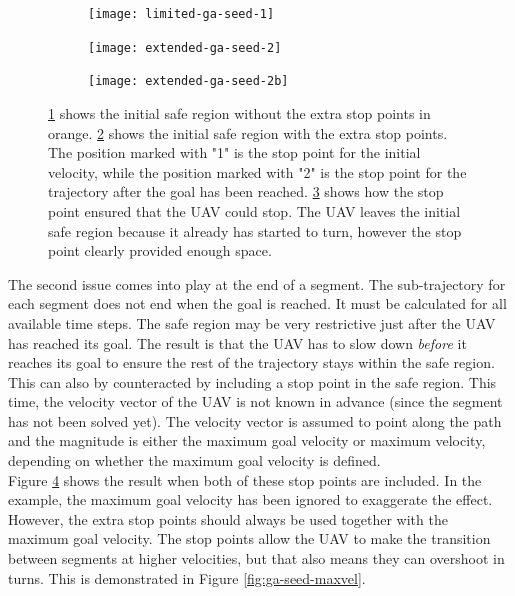 \begin{figure}
	\centering
	\begin{subfigure}[t]{0.30\columnwidth}
        		\texttt{[image: limited-ga-seed-1]}
        		\caption{}
        		\label{fig:ga-seed-without}
	\end{subfigure}
	\hfill
	\begin{subfigure}[t]{0.30\columnwidth}
        		\texttt{[image: extended-ga-seed-2]}
        		\caption{}
        		 \label{fig:ga-seed-with}
	\end{subfigure}	
	\hfill
	\begin{subfigure}[t]{0.30\columnwidth}
        		\texttt{[image: extended-ga-seed-2b]}
        		\caption{}
        		 \label{fig:ga-seed-nomaxvela}
	\end{subfigure}		
	\caption[The effect of the inclusion of stop points on the initial convex safe region.]{\ref{fig:ga-seed-without} shows the initial safe region without the extra stop points in orange. \ref{fig:ga-seed-with} shows the initial safe region with the extra stop points. The position marked with "1" is the stop point for the initial velocity, while the position marked with "2" is the stop point for the trajectory after the goal has been reached. \ref{fig:ga-seed-nomaxvela} shows how the stop point ensured that the UAV could stop. The UAV leaves the initial safe region because it already has started to turn, however the stop point clearly provided enough space.}
    \label{fig:ga-seed-1}     
\end{figure}


The second issue comes into play at the end of a segment. The sub-trajectory for each segment does not end when the goal is reached. It must be calculated for all available time steps. The safe region may be very restrictive just after the UAV has reached its goal. The result is that the UAV has to slow down \emph{before} it reaches its goal to ensure the rest of the trajectory stays within the safe region. This can also by counteracted by including a stop point in the safe region. This time, the velocity vector of the UAV is not known in advance (since the segment has not been solved yet). The velocity vector is assumed to point along the path and the magnitude is either the maximum goal velocity or maximum velocity, depending on whether the maximum goal velocity is defined.\\
Figure \ref{fig:ga-seed-1} shows the result when both of these stop points are included. In the example, the maximum goal velocity has been ignored to exaggerate the effect. However, the extra stop points should always be used together with the maximum goal velocity. The stop points allow the UAV to make the transition between segments at higher velocities, but that also means they can overshoot in turns. This is demonstrated in Figure \ref{fig:ga-seed-maxvel}.

